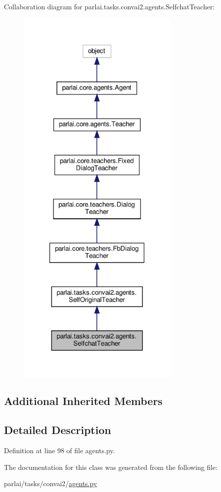 Collaboration diagram for parlai.\+tasks.\+convai2.\+agents.\+Selfchat\+Teacher\+:\nopagebreak
\begin{figure}[H]
\begin{center}
\leavevmode
\includegraphics[width=224pt]{d4/d2c/classparlai_1_1tasks_1_1convai2_1_1agents_1_1SelfchatTeacher__coll__graph}
\end{center}
\end{figure}
\subsection*{Additional Inherited Members}


\subsection{Detailed Description}


Definition at line 98 of file agents.\+py.



The documentation for this class was generated from the following file\+:\begin{DoxyCompactItemize}
\item 
parlai/tasks/convai2/\hyperlink{parlai_2tasks_2convai2_2agents_8py}{agents.\+py}\end{DoxyCompactItemize}
